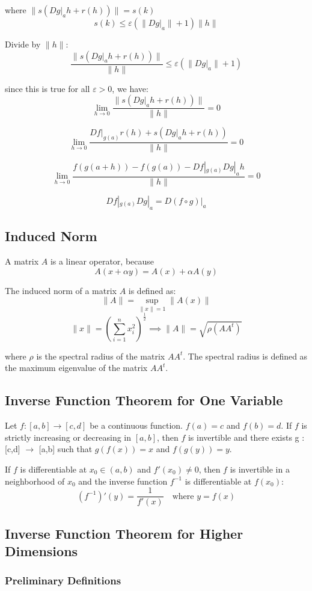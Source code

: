 \documentclass[11pt]{article}
\begin{document}
where $\|s(Dg|_{a} h + r(h))\| = s(k)$ 
\[
s(k) \leq \varepsilon \left( \| Dg|_{a} \| + 1 \right) \| h \|
\]

Divide by $\| h \|$:
\[
\frac{\| s(Dg|_{a} h + r(h)) \|}{\| h \|} \leq \varepsilon \left( \| Dg|_{a} \| + 1 \right)
\]

since this is true for all $\varepsilon > 0$, we have:
\[
\lim_{h \to 0} \frac{\| s(Dg|_{a} h + r(h)) \|}{\| h \|} = 0
\]

\[
\lim_{h \to 0} \frac{Df|_{g(a)} r(h) + s(Dg|_{a} h + r(h))}{\| h \|} = 0
\]

\[
\lim_{h \to 0} \frac{f(g(a+h)) - f(g(a)) - Df|_{g(a)} Dg|_{a} h}{\| h \|} = 0
\]

\[
Df|_{g(a)} Dg|_{a} = D(f \circ g)|_{a}
\]

\subsection{Induced Norm}
A matrix $A$ is a linear operator, because
\[
A(x + \alpha y) = A(x) + \alpha A(y)
\]

The induced norm of a matrix $A$ is defined as:
\[
\| A \| = \sup_{\|x\| = 1} \| A(x) \|
\]
\[
\|x\| = \left(\sum_{i=1}^{n} x_i^2 \right)^{\frac{1}{2}} \implies \|A\| = \sqrt{\rho (AA^t)}
\]

where $\rho$ is the spectral radius of the matrix $AA^t$. The spectral radius is defined as the maximum eigenvalue of the matrix $AA^t$.

\subsection{Inverse Function Theorem for One Variable}
Let $f : [a,b] \rightarrow [c,d]$ be a continuous function. $f(a) = c$ and $f(b) = d$. If $f$ is strictly increasing or decreasing in $[a,b]$, then $f$ is invertible and there exists g : [c,d] $\rightarrow$ [a,b] such that $g(f(x)) = x$ and $f(g(y)) = y$.

If $f$ is differentiable at $x_0 \in (a,b)$ and $f'(x_0) \neq 0$, then $f$ is invertible in a neighborhood of $x_0$ and the inverse function $f^{-1}$ is differentiable at $f(x_0)$:
\[
(f^{-1})'(y) = \frac{1}{f'(x)} \quad \text{where } y = f(x)
\]

\subsection{Inverse Function Theorem for Higher Dimensions}
\subsubsection{Preliminary Definitions}
\end{document}
